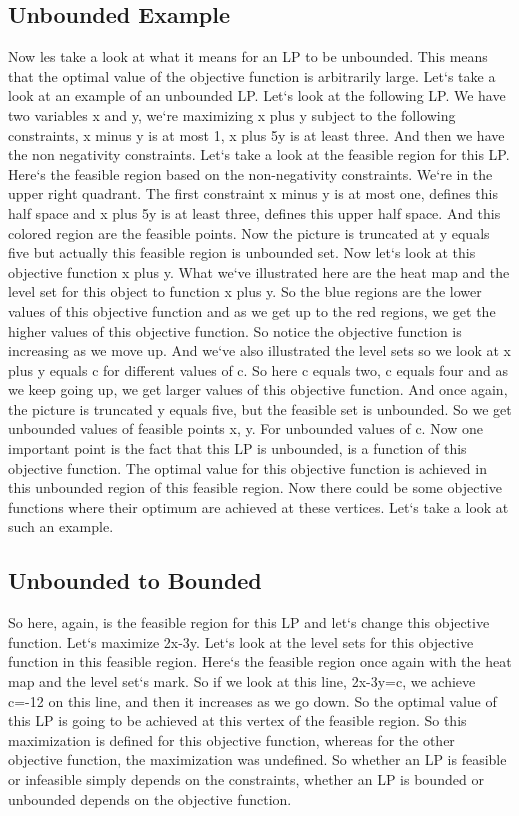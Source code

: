 \subsection{Unbounded Example}
Now les take a look at what it means for an LP to be unbounded.
This means that the optimal value of the objective function is arbitrarily large.
Let`s take a look at an example of an unbounded LP\@.
Let`s look at the following LP\@.
We have two variables x and y, we`re maximizing x plus y subject to the following constraints, x minus y is at most 1, x plus 5y is at least three.
And then we have the non negativity constraints.
Let`s take a look at the feasible region for this LP\@.
Here`s the feasible region based on the non-negativity constraints.
We`re in the upper right quadrant.
The first constraint x minus y is at most one, defines this half space and x plus 5y is at least three, defines this upper half space.
And this colored region are the feasible points.
Now the picture is truncated at y equals five but actually this feasible region is unbounded set.
Now let`s look at this objective function x plus y.
What we`ve illustrated here are the heat map and the level set for this object to function x plus y.
So the blue regions are the lower values of this objective function and as we get up to the red regions, we get the higher values of this objective function.
So notice the objective function is increasing as we move up.
And we`ve also illustrated the level sets so we look at x plus y equals c for different values of c.
So here c equals two, c equals four and as we keep going up, we get larger values of this objective function.
And once again, the picture is truncated y equals five, but the feasible set is unbounded.
So we get unbounded values of feasible points x, y.
For unbounded values of c.
Now one important point is the fact that this LP is unbounded, is a function of this objective function.
The optimal value for this objective function is achieved in this unbounded region of this feasible region.
Now there could be some objective functions where their optimum are achieved at these vertices.
Let`s take a look at such an example.

\subsection{Unbounded to Bounded}
So here, again, is the feasible region for this LP and let`s change this objective function.
Let`s maximize 2x-3y.
Let`s look at the level sets for this objective function in this feasible region.
Here`s the feasible region once again with the heat map and the level set`s mark.
So if we look at this line, 2x-3y=c, we achieve c=-12 on this line, and then it increases as we go down.
So the optimal value of this LP is going to be achieved at this vertex of the feasible region.
So this maximization is defined for this objective function, whereas for the other objective function, the maximization was undefined.
So whether an LP is feasible or infeasible simply depends on the constraints, whether an LP is bounded or unbounded depends on the objective function.

